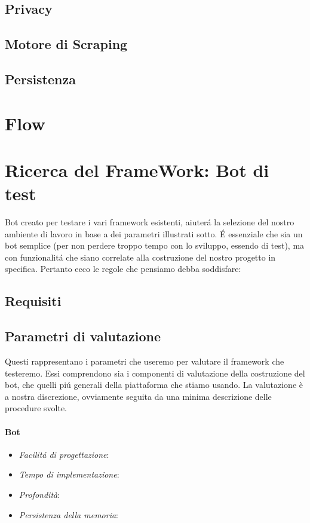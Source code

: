\documentclass[]{article}
\begin{document}
\subsection{Privacy}

\subsection{Motore di Scraping}

\subsection{Persistenza}


\section{Flow}

\section{Ricerca del FrameWork: Bot di test}
Bot creato per testare i vari framework esistenti, aiuterá la selezione del nostro ambiente di lavoro in base a dei parametri illustrati sotto. É essenziale che sia un bot semplice (per non perdere troppo tempo con lo sviluppo, essendo di test), ma con funzionalitá che siano correlate alla costruzione del nostro progetto in specifica. Pertanto ecco le regole che pensiamo debba soddisfare:
\subsection{Requisiti}
\subsection{Parametri di valutazione}
Questi rappresentano i parametri che useremo per valutare il framework che testeremo. Essi comprendono sia i componenti di valutazione della costruzione del bot, che quelli piú generali della piattaforma che stiamo usando. La valutazione è a nostra discrezione, ovviamente seguita da una minima descrizione delle procedure svolte.

\paragraph{Bot}
\begin{itemize}
\item \textit{Facilitá di progettazione}: 
\item \textit{Tempo di implementazione}: 
\item \textit{Profondità}: 
\item \textit{Persistenza della memoria}: 
\end{itemize}
\end{document}
